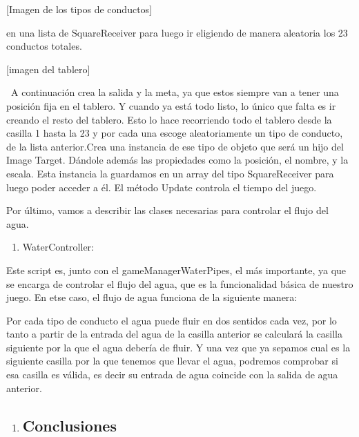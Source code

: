 {[}Imagen de los tipos de conductos{]}

en una lista de SquareReceiver para luego ir eligiendo de manera
aleatoria los 23 conductos totales.

{[}imagen del tablero{]}

~A continuación crea la salida y la meta, ya que estos siempre van a
tener una posición fija en el tablero. Y cuando ya está todo listo, lo
único que falta es ir creando el resto del tablero. Esto lo hace
recorriendo todo el tablero desde la casilla 1 hasta la 23 y por cada
una escoge aleatoriamente un tipo de conducto, de la lista anterior.Crea
una instancia de ese tipo de objeto que será un hijo del Image Target.
Dándole además las propiedades como la posición, el nombre, y la escala.
Esta instancia la guardamos en un array del tipo SquareReceiver para
luego poder acceder a él. El método Update controla el tiempo del juego.

Por último, vamos a describir las clases necesarias para controlar el
flujo del agua.

\begin{enumerate}
\def\labelenumi{\arabic{enumi}.}
\setcounter{enumi}{2}
\itemsep1pt\parskip0pt
\item
  WaterController:
\end{enumerate}

Este script es, junto con el gameManagerWaterPipes, el más importante,
ya que se encarga de controlar el flujo del agua, que es la
funcionalidad básica de nuestro juego. En etse caso, el flujo de agua
funciona de la siguiente manera:

Por cada tipo de conducto el agua puede fluir en dos sentidos cada vez,
por lo tanto a partir de la entrada del agua de la casilla anterior se
calculará la casilla siguiente por la que el agua debería de fluir. Y
una vez que ya sepamos cual es la siguiente casilla por la que tenemos
que llevar el agua, podremos comprobar si esa casilla es válida, es
decir su entrada de agua coincide con la salida de agua anterior.

\begin{enumerate}
\def\labelenumi{\arabic{enumi}.}
\setcounter{enumi}{3}
\item
  \subsection{Conclusiones~~~~~~~~ ~~~~~~~~~~~~~~~~~
  ~~~~~~~~}\label{h.19c6y18}
\end{enumerate}

